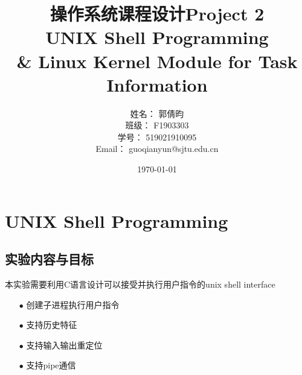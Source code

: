 \documentclass{article}
\title{\textbf{操作系统课程设计Project 2\\UNIX Shell Programming\\ \& Linux Kernel Module for Task Information}} %
\author{姓名： 郭倩昀  
\\班级： F1903303  
\\学号： 519021910095  
\\Email： guoqianyun@sjtu.edu.cn} %
\date{\today} %
\begin{document}
\maketitle %
\tableofcontents
\newpage
\section{UNIX Shell Programming}
\subsection{实验内容与目标}
本实验需要利用C语言设计可以接受并执行用户指令的unix shell interface
\begin{itemize}
\item[$\bullet$]创建子进程执行用户指令
\item[$\bullet$]支持历史特征
\item[$\bullet$]支持输入输出重定位
\item[$\bullet$]支持pipe通信
\end{itemize}
\end{document}
